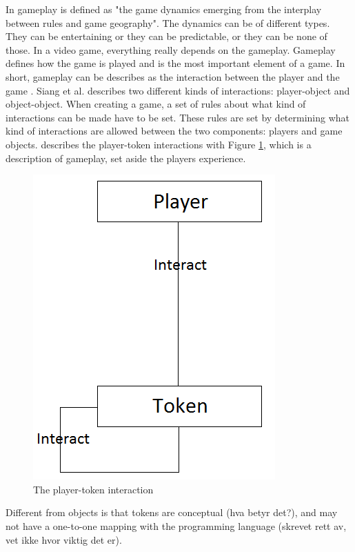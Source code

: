 In \cite{understandingvg} gameplay is defined as "the game dynamics emerging from the interplay between rules and game geography". The dynamics can be of different types. They can be entertaining or they can be predictable, or they can be none of those. In a video game, everything really depends on the gameplay. Gameplay defines how the game is played and is the most important element of a game. In short, gameplay can be describes as the interaction between the player and the game \cite{umlapproach}. Siang et al. describes two different kinds of interactions: player-object and object-object. When creating a game, a set of rules about what kind of interactions can be made have to be set. These rules are set by determining what kind of interactions are allowed between the two components: players and game objects. \cite{umlapproach} describes the player-token interactions with Figure \ref{fig:playertoken}, which is a description of gameplay, set aside the players experience.
\begin{figure}
\begin{center}
\includegraphics[scale=0.5]{playertoken}
\caption[The player-token interaction]{The player-token interaction \cite{umlapproach}}
\label{fig:playertoken}
\end{center}
\end{figure} 
Different from objects is that tokens are conceptual (hva betyr det?), and may not have a one-to-one mapping with the programming language (skrevet rett av, vet ikke hvor viktig det er).
